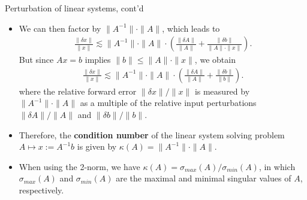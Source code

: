 \documentclass[t,usepdftitle=false]{beamer}
\begin{document}
\begin{frame}{Perturbation of linear systems, cont'd}
\begin{itemize}
\item[]
We can then factor by $\|A^{-1}\|\cdot\|A\|$, which leads to
\begin{align*}
\frac{\|\delta x\|}{\|x\|}\lesssim
\|A^{-1}\|\cdot\|A\|\cdot
\left(\frac{\|\delta A\|}{\|A\|}
+\frac{\|\delta b\|}{\|A\|\cdot\|x\|}\right).
\end{align*}
But since $Ax=b$ implies $\|b\|\leq\|A\|\cdot\|x\|$, we obtain
\begin{align*}
\frac{\|\delta x\|}{\|x\|}\lesssim
\|A^{-1}\|\cdot\|A\|\cdot
\left(\frac{\|\delta A\|}{\|A\|}
+\frac{\|\delta b\|}{\|b\|}\right).
\end{align*}
where the relative forward error $\|\delta x\|/\|x\|$ is measured by $\|A^{-1}\|\cdot\|A\|$ as a multiple of the relative input perturbations $\|\delta A\|/\|A\|$ and $\|\delta b\|/\|b\|$.
\item Therefore, the \textbf{condition number} of the linear system solving problem $A\mapsto x:=A^{-1}b$ 
is given by $\kappa(A)=\|A^{-1}\|\cdot\|A\|$.
\item When using the 2-norm, we have $\kappa(A)=\sigma_{max}(A)/\sigma_{min}(A)$, in which $\sigma_{max}(A)$ and $\sigma_{min}(A)$ are the maximal and minimal singular values of $A$, respectively.
\end{itemize}
\end{frame}
\end{document}
